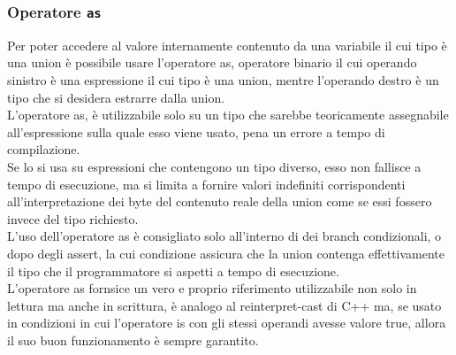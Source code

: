 \subsubsection{Operatore \texttt{as}}
Per poter accedere al valore internamente contenuto da una variabile il cui tipo è una union è possibile usare 
l’operatore as, operatore binario il cui operando sinistro è una espressione il cui tipo è una union, mentre l’operando destro 
è un tipo che si desidera estrarre dalla union. \\

L’operatore as, è utilizzabile solo su un tipo che sarebbe teoricamente assegnabile all’espressione sulla quale esso viene usato, 
pena un errore a tempo di compilazione. \\

Se lo si usa su espressioni che contengono un tipo diverso, esso non fallisce a tempo di esecuzione, ma si limita a fornire valori 
indefiniti corrispondenti all’interpretazione dei byte del contenuto reale della union come se essi fossero invece del tipo richiesto. \\

L’uso dell’operatore as è consigliato solo all’interno di dei branch condizionali, o dopo degli assert, la cui condizione assicura che la union
contenga effettivamente il tipo che il programmatore si aspetti a tempo di esecuzione. \\   

L’operatore as fornsice un vero e proprio riferimento utilizzabile non solo in lettura ma anche in scrittura, 
è analogo al reinterpret-cast di C++ ma, se usato in condizioni in cui l’operatore is con gli stessi operandi 
avesse valore true, allora il suo buon funzionamento è sempre garantito.